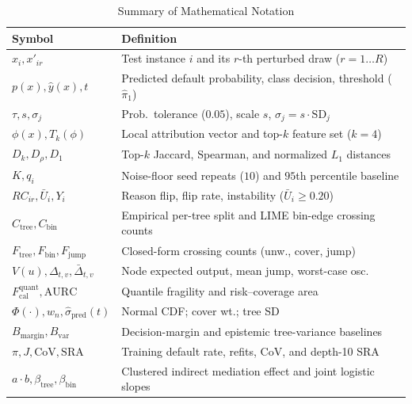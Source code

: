 \documentclass[conference]{IEEEtran}
\begin{document}
\begin{table}[!t]
\centering
\caption{Summary of Mathematical Notation}
\label{tab:notation}
\scriptsize
\renewcommand{\arraystretch}{0.77}
\setlength{\tabcolsep}{2.4pt}
\begin{tabular}{@{}ll@{}}
\toprule
\textbf{Symbol} & \textbf{Definition} \\
\midrule
$x_i, x'_{ir}$ & Test instance $i$ and its $r$-th perturbed draw ($r=1\dots R$) \\
$p(x), \hat{y}(x), t$ & Predicted default probability, class decision, threshold ($\hat{\pi}_1$) \\
$\tau, s, \sigma_j$ & Prob.\ tolerance ($0.05$), scale $s$, $\sigma_j = s\cdot\mathrm{SD}_j$ \\
$\phi(x), T_k(\phi)$ & Local attribution vector and top-$k$ feature set ($k=4$) \\
$D_k, D_\rho, D_1$ & Top-$k$ Jaccard, Spearman, and normalized $L_1$ distances \\
$K, q_i$ & Noise-floor seed repeats ($10$) and $95$th percentile baseline \\
$RC_{ir}, \bar{U}_i, Y_i$ & Reason flip, flip rate, instability ($\bar{U}_i \ge 0.20$) \\
$C_{\mathrm{tree}}, C_{\mathrm{bin}}$ & Empirical per-tree split and LIME bin-edge crossing counts \\
$F_{\mathrm{tree}}, F_{\mathrm{bin}}, F_{\mathrm{jump}}$ & Closed-form crossing counts (unw., cover, jump) \\
$V(u), \Delta_{t,v}, \bar{\Delta}_{t,v}$ & Node expected output, mean jump, worst-case osc. \\
$F_{\mathrm{cal}}^{\mathrm{quant}}, \mathrm{AURC}$ & Quantile fragility and risk--coverage area \\
$\Phi(\cdot), w_n, \hat{\sigma}_{\mathrm{pred}}(t)$ & Normal CDF; cover wt.; tree SD \\
$B_{\mathrm{margin}}, B_{\mathrm{var}}$ & Decision-margin and epistemic tree-variance baselines \\
$\pi, J, \mathrm{CoV}, \mathrm{SRA}$ & Training default rate, refits, CoV, and depth-10 SRA \\
$a\cdot b, \beta_{\mathrm{tree}}, \beta_{\mathrm{bin}}$ & Clustered indirect mediation effect and joint logistic slopes \\
\bottomrule
\end{tabular}
\end{table}
\end{document}

